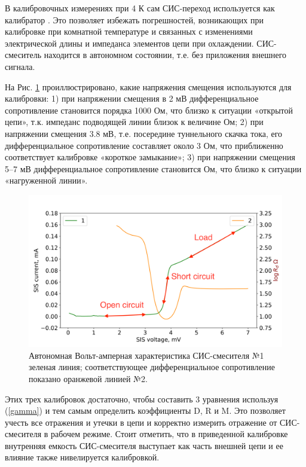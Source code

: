 \documentclass[a4paper]{article}
\begin{document}
В калибровочных измерениях при 4 К сам СИС-переход используется как калибратор \cite{Serres}. Это позволяет избежать погрешностей, возникающих при калибровке при 
комнатной температуре и связанных с изменениями электрической длины и импеданса элементов цепи при охлаждении. СИС-смеситель находится в автономном 
состоянии, т.е. без приложения внешнего сигнала. 


На Рис. \ref{pic-cal} проиллюстрировано, какие напряжения смещения используются для калибровки:  1) при напряжении смещения в 2 мВ  дифференциальное сопротивление 
становится порядка 1000 Ом, что близко к ситуации «открытой цепи», т.к. импеданс подводящей линии близок к величине  Ом; 2) при напряжении смещения 3.8 мВ, 
т.е. посередине туннельного скачка тока, его дифференциальное сопротивление составляет около 3 Ом, что приближенно соответствует калибровке «короткое замыкание»; 
3) при напряжении смещения 5–7 мВ дифференциальное сопротивление становится  Ом, что близко к ситуации «нагруженной линии». 

\begin{figure}[H]
    \begin{center}
        \includegraphics[scale=0.5]{cal.png}
        \caption{Автономная Вольт-амперная характеристика СИС-смесителя №1 зеленая линия; соответствующее дифференциальное сопротивление показано оранжевой линией №2.}
        \label{pic-cal}
    \end{center}
\end{figure}


Этих трех калибровок достаточно, чтобы составить 3 уравнения используя (\ref{gamma}) и тем самым определить коэффициенты D, R и M. Это позволяет учесть все отражения и 
утечки в цепи и корректно измерить отражение от СИС-смесителя в рабочем режиме. Стоит отметить, что в приведенной калибровке внутренняя емкость СИС-смесителя выступает 
как часть внешней цепи и ее влияние также нивелируется калибровкой.
\end{document}
